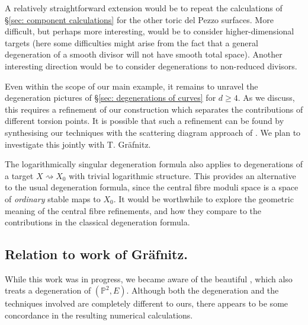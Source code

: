 \documentclass[11pt]{amsart}
\theoremstyle{definition}
\theoremstyle{definition}
\newcommand{\PP}{\mathbb{P}}
\begin{document}
A relatively straightforward extension would be to repeat the calculations of \S \ref{sec: component calculations} for the other toric del Pezzo surfaces. More difficult, but perhaps more interesting, would be to consider higher-dimensional targets (here some difficulties might arise from the fact that a general degeneration of a smooth divisor will not have smooth total space). Another interesting direction would be to consider degenerations to non-reduced divisors.

Even within the scope of our main example, it remains to unravel the degeneration pictures of  \S \ref{sec: degenerations of curves} for $d \geq 4$. As we discuss, this requires a refinement of our construction which separates the contributions of different torsion points. It is possible that such a refinement can be found by synthesising our techniques with the scattering diagram approach of \cite{Graefnitz}. We plan to investigate this jointly with T. Gr\"afnitz.

The logarithmically singular degeneration formula also applies to degenerations of a target $X \rightsquigarrow X_0$ with trivial logarithmic structure. This provides an alternative to the usual degeneration formula, since the central fibre moduli space is a space of \emph{ordinary} stable maps to $X_0$. It would be worthwhile to explore the geometric meaning of the central fibre refinements, and how they compare to the contributions in the classical degeneration formula.

\subsection{Relation to work of Gr\"afnitz.} \label{rmk: Graefnitz}
While this work was in progress, we became aware of the beautiful \cite{Graefnitz}, which also treats a degeneration of $(\PP^2,E)$. Although both the degeneration and the techniques involved are completely different to ours, there appears to be some concordance in the resulting numerical calculations.
\end{document}
